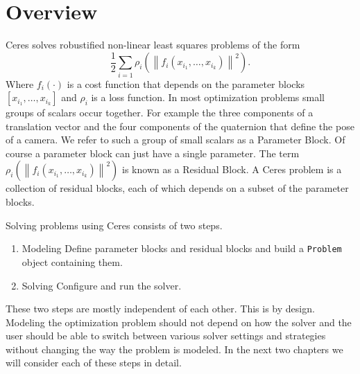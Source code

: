 \chapter{Overview}
\label{chapter:overview}
Ceres solves robustified non-linear least squares problems of the form 
\begin{equation}
	\frac{1}{2}\sum_{i=1} \rho_i\left(\left\|f_i\left(x_{i_1},\hdots,x_{i_k}\right)\right\|^2\right).
	\label{eq:ceresproblem}
\end{equation}
Where $f_i(\cdot)$ is a  cost function that depends on the parameter blocks $\left[x_{i_1}, \hdots , x_{i_k}\right]$ and  $\rho_i$ is a loss function. In most optimization problems small groups of scalars occur together. For example the three components of a translation vector and the four components of the quaternion that define the pose of a camera. We refer to such a group of small scalars as a Parameter Block. Of course a parameter block can just have a single parameter. 
The term $ \rho_i\left(\left\|f_i\left(x_{i_1},\hdots,x_{i_k}\right)\right\|^2\right)$ is known as a Residual Block. A Ceres problem is a collection of residual blocks, each of which depends on a subset of the parameter blocks.

Solving problems using Ceres consists of two steps.
\begin{enumerate}
	\item{Modeling} Define parameter blocks and  residual blocks and build a \texttt{Problem} object containing them.
	\item{Solving} Configure and run the solver.
\end{enumerate}

These two steps are mostly independent of each other. This is by design. Modeling the optimization problem should not depend on how the solver and the user should be able to switch between various solver settings and strategies without changing the way the problem is modeled. In the next two chapters we will consider each of these steps in detail.
